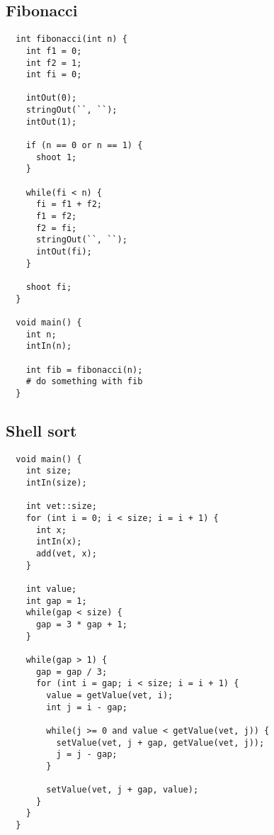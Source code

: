 \documentclass[a4paper, 12pt, article]{memoir}
\begin{document}
\subsection{Fibonacci}
\label{subsec:fibonacci}
\begin{lstlisting}
  int fibonacci(int n) {
    int f1 = 0;
    int f2 = 1;
    int fi = 0;

    intOut(0);
    stringOut(``, ``);
    intOut(1);

    if (n == 0 or n == 1) {
      shoot 1;
    }

    while(fi < n) {
      fi = f1 + f2;
      f1 = f2;
      f2 = fi;
      stringOut(``, ``);
      intOut(fi);
    }

    shoot fi;
  }

  void main() {
    int n;
    intIn(n);

    int fib = fibonacci(n);
    # do something with fib
  }
\end{lstlisting}

\subsection{Shell sort}
\label{subsec:shelsort}
\begin{lstlisting}
  void main() {
    int size;
    intIn(size);

    int vet::size;
    for (int i = 0; i < size; i = i + 1) {
      int x;
      intIn(x);
      add(vet, x);
    }

    int value;
    int gap = 1;
    while(gap < size) {
      gap = 3 * gap + 1;
    }

    while(gap > 1) {
      gap = gap / 3;
      for (int i = gap; i < size; i = i + 1) {
        value = getValue(vet, i);
        int j = i - gap;

        while(j >= 0 and value < getValue(vet, j)) {
          setValue(vet, j + gap, getValue(vet, j));
          j = j - gap;
        }

        setValue(vet, j + gap, value);
      }
    }
  }
\end{lstlisting}
\end{document}
